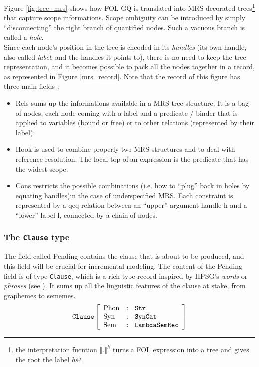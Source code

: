 \documentclass[11pt]{article}
\begin{document}
				Figure \ref{fig:tree_mrs} shows how FOL-GQ is translated into MRS decorated trees\footnote{the interpretation fucntion $\llbracket . \rrbracket^h$ turns a FOL expression into a tree and gives the root the label $h$} that capture scope informations. Scope ambiguity can be introduced by simply ``disconnecting'' the right branch of quantified nodes. Such a vacuous branch is called a \textit{hole}.\\
				Since each node's position in the tree is encoded in its \textit{handles} (its own handle, also called \textit{label}, and the handles it points to), there is no need to keep the tree representation, and it becomes possible to pack all the nodes together in a record, as represented in Figure \ref{mrs_record}. Note that the record of this figure has three main fields :
				\begin{itemize}
					\item Rels sums up the informations available in a MRS tree structure. It is a bag of nodes, each node coming with a label and a predicate / binder that is applied to variables (bound or free) or to other relations (represented by their label).
					\item Hook is used to combine properly two MRS structures and to deal with reference resolution. The local top of an expression is the predicate that has the widest scope.
					\item Cons restricts the possible combinations (i.e. how to ``plug'' back in holes by equating handles)in the case of underspecified MRS. Each constraint is represented by a qeq relation between an ``upper'' argument handle h and a ``lower'' label l, connected by a chain of nodes.
				\end{itemize}
				




			\subsubsection{The \texttt{Clause} type}
				The field called Pending contains the clause that is about to be produced, and this field will be crucial for incremental modeling. The content of the Pending field is of type \texttt{Clause}, which is a rich type record inspired by HPSG's \textit{words} or \textit{phrases} (see \cite{sag2003}). It sums up all the linguistic features of the clause at stake, from graphemes to sememes.\\
				\begin{equation*}
					\texttt{Clause}
					\left [
					\begin{array}{l l l}
					\mbox{Phon} &:& \texttt{Str} \\
					\mbox{Syn} &:& \texttt{SynCat} \\
					\mbox{Sem} &:& \texttt{LambdaSemRec} \\
					\end{array}
					\right ]
				\end{equation*}
\end{document}
